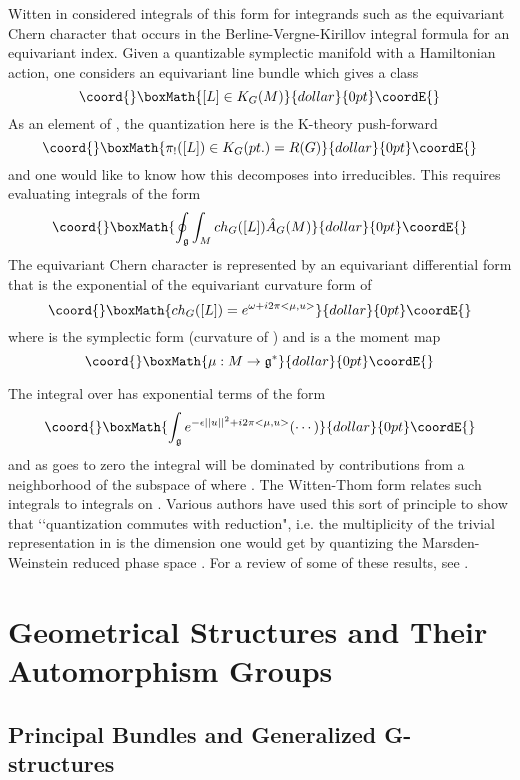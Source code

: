 \documentclass[a4paper,a4paper]{article}
\theoremstyle{conjecture}
\begin{document}
Witten in \cite{Witten-localization} considered integrals of this form
for integrands such as the equivariant Chern character that occurs in the
Berline-Vergne-Kirillov integral formula for an equivariant index.  Given
a quantizable symplectic manifold \coordHE{} with a Hamiltonian \coordHE{} action, one
considers an equivariant line bundle \coordHE{} which gives a class
$$\coord{}\boxMath{[L]\in K_G(M)}{dollar}{0pt}\coordE{}$$
As an element of \coordHE{}, the quantization here is the K-theory push-forward
$$\coord{}\boxMath{\pi_!([L])\in K_G(pt.)=R(G)}{dollar}{0pt}\coordE{}$$
and one would like to know how this decomposes into irreducibles.  This
requires evaluating integrals of the form
$$\coord{}\boxMath{\oint_{\mathfrak g}\int_M ch_G([L])\hat A_G(M)}{dollar}{0pt}\coordE{}$$
The equivariant Chern character is represented by an equivariant differential
form that is the exponential of the equivariant curvature form of \coordHE{}  $$\coord{}\boxMath{ch_G([L])=e^{\omega +i2\pi<\mu,u>}}{dollar}{0pt}\coordE{}$$
where \myHighlight{$\omega$}\coordHE{} is the symplectic form (curvature of \coordHE{}) and \myHighlight{$\mu$}\coordHE{} is a the
moment map
$$\coord{}\boxMath{\mu:M\rightarrow {\mathfrak g}^*}{dollar}{0pt}\coordE{}$$

The integral over \coordHE{} has exponential terms of the form
$$\coord{}\boxMath{\int_{\mathfrak g}e^{-\epsilon ||u||^2 +i2\pi<\mu,u>} (\cdots)}{dollar}{0pt}\coordE{}$$
and as \myHighlight{$\epsilon$}\coordHE{} goes to zero the integral will be dominated by contributions from
a neighborhood of the subspace of \coordHE{} where \coordHE{}.  The Witten-Thom form relates
such integrals to integrals on \coordHE{}.  Various authors
have used this sort of principle to show that \lq\lq quantization commutes with
reduction", i.e. the multiplicity of the trivial representation in \myHighlight{$\pi_!([L])$}\coordHE{}
is the dimension one would get by quantizing the Marsden-Weinstein reduced
phase space \coordHE{}.  For a review of some of these results, see
\cite{Sjamaar}.


\section{Geometrical Structures and Their Automorphism Groups}

\subsection{Principal Bundles and Generalized G-structures}
\end{document}
